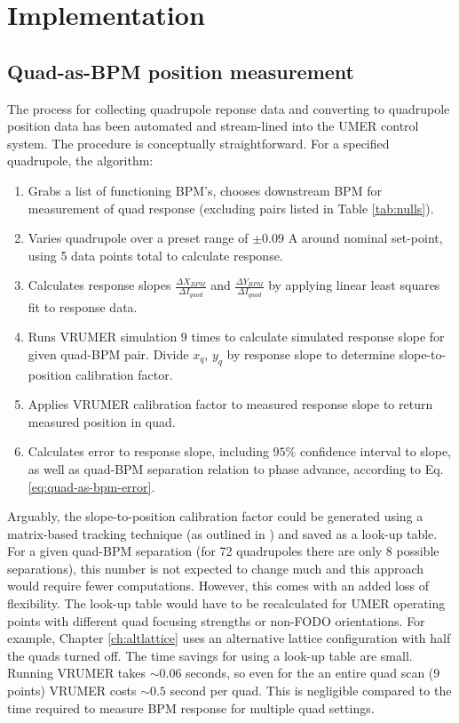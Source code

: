 \section{Implementation} \label{sec:steering:implementation}

\subsection{Quad-as-BPM position measurement}

The process for collecting quadrupole reponse data and converting to quadrupole position data has been automated and stream-lined into the UMER control system. The procedure is conceptually straightforward. For a specified quadrupole, the algorithm:

\begin{enumerate}
\item Grabs a list of functioning BPM's, chooses downstream BPM for measurement of quad response (excluding pairs listed in Table \ref{tab:nulls}).
\item Varies quadrupole over a preset range of $\pm 0.09$ A around nominal set-point, using 5 data points total to calculate response.
\item Calculates response slopes $\frac{\Delta X_{BPM}}{\Delta I_{quad}}$ and $\frac{\Delta Y_{BPM}}{\Delta I_{quad}}$ by applying linear least squares fit to response data.
\item Runs VRUMER simulation 9 times to calculate simulated response slope for given quad-BPM pair. Divide $x_q$, $y_q$ by response slope to determine slope-to-position calibration factor. 
\item Applies VRUMER calibration factor to measured response slope to return measured position in quad. 
\item Calculates error to response slope, including $95\%$ confidence interval to slope, as well as quad-BPM separation relation to phase advance, according to Eq. \ref{eq:quad-as-bpm-error}. 
\end{enumerate}

Arguably, the slope-to-position calibration factor could be generated using a matrix-based tracking technique (as outlined in \cite{KPRnote}) and saved as a look-up table. For a given quad-BPM separation (for 72 quadrupoles there are only 8 possible separations), this number is not expected to change much and this approach would require fewer computations. However, this comes with an added loss of flexibility. The look-up table would have to be recalculated for UMER operating points with different quad focusing strengths or non-FODO orientations. For example, Chapter \ref{ch:altlattice} uses an alternative lattice configuration with half the quads turned off. 
The time savings for using a look-up table are small. Running VRUMER takes $\sim 0.06$ 
seconds, so even for the an entire quad scan (9 points) VRUMER costs $\sim 0.5$ second per quad. This is negligible compared to the time required to measure BPM response for multiple quad settings.


